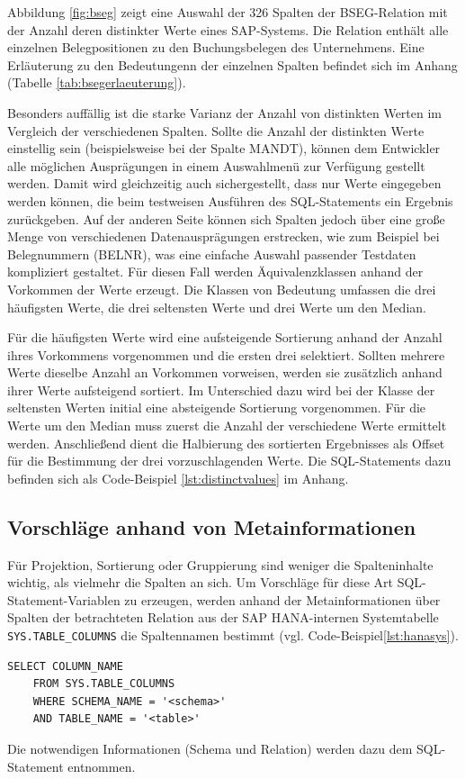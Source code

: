 Abbildung \ref{fig:bseg} zeigt eine Auswahl der 326 Spalten der BSEG-Relation mit der Anzahl deren distinkter Werte eines SAP-Systems.
Die Relation enthält alle einzelnen Belegpositionen zu den Buchungsbelegen des Unternehmens.
Eine Erläuterung zu den Bedeutungenn der einzelnen Spalten befindet sich im Anhang (Tabelle \ref{tab:bsegerlaeuterung}).

Besonders auffällig ist die starke Varianz der Anzahl von distinkten Werten im Vergleich der verschiedenen Spalten.
Sollte die Anzahl der distinkten Werte einstellig sein (beispielsweise bei der Spalte MANDT), können dem Entwickler alle möglichen Ausprägungen in einem Auswahlmenü zur Verfügung gestellt werden.
Damit wird gleichzeitig auch sichergestellt, dass nur Werte eingegeben werden können, die beim testweisen Ausführen des SQL-Statements ein Ergebnis zurückgeben.
Auf der anderen Seite können sich Spalten jedoch über eine große Menge von verschiedenen Datenausprägungen erstrecken, wie zum Beispiel bei Belegnummern (BELNR), was eine einfache Auswahl passender Testdaten kompliziert gestaltet.
Für diesen Fall werden Äquivalenzklassen anhand der Vorkommen der Werte erzeugt. Die Klassen von Bedeutung umfassen die drei häufigsten Werte, die drei seltensten Werte und drei Werte um den Median.

Für die häufigsten Werte wird eine aufsteigende Sortierung anhand der Anzahl ihres Vorkommens vorgenommen und die ersten drei selektiert.
Sollten mehrere Werte dieselbe Anzahl an Vorkommen vorweisen, werden sie zusätzlich anhand ihrer Werte aufsteigend sortiert.
Im Unterschied dazu wird bei der Klasse der seltensten Werten initial eine absteigende Sortierung vorgenommen.
Für die Werte um den Median muss zuerst die Anzahl der verschiedene Werte ermittelt werden.
Anschließend dient die Halbierung des sortierten Ergebnisses als Offset für die Bestimmung der drei vorzuschlagenden Werte.
Die SQL-Statements dazu befinden sich als Code-Beispiel \ref{lst:distinctvalues} im Anhang.

\subsection{Vorschläge anhand von Metainformationen}\label{chap:databasemeta}
Für Projektion, Sortierung oder Gruppierung sind weniger die Spalteninhalte wichtig, als vielmehr die Spalten an sich.
Um Vorschläge für diese Art SQL-Statement-Variablen zu erzeugen, werden anhand der Metainformationen über Spalten der betrachteten Relation aus der SAP HANA-internen Systemtabelle \texttt{SYS.TABLE\_COLUMNS} die Spaltennamen bestimmt (vgl. Code-Beispiel\ref{lst:hanasys}).
\begin{lstlisting}[caption={SQL-Statement für Metainformationen zu Relationen}, label={lst:hanasys}, language=mySQL, deletekeywords={schema,table}]
	SELECT COLUMN_NAME
	FROM SYS.TABLE_COLUMNS
	WHERE SCHEMA_NAME = '<schema>'
	AND TABLE_NAME = '<table>'
\end{lstlisting}
Die notwendigen Informationen (Schema und Relation) werden dazu dem SQL-Statement entnommen.

